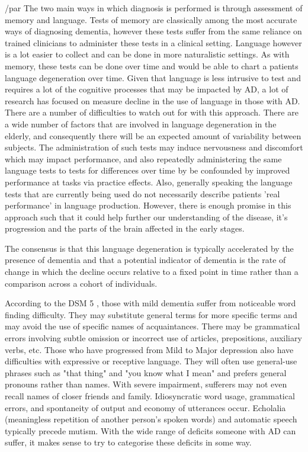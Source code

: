 \documentclass{article}
\begin{document}
/par
The two main ways in which diagnosis is performed is through assessment of memory and language. Tests of memory are classically among the most accurate ways of diagnosing dementia, however these tests suffer from the same reliance on trained clinicians to administer these tests in a clinical setting. Language however is a lot easier to collect and can be done in more naturalistic settings. As with memory, these tests can be done over time and would be able to chart a patients language degeneration over time. Given that language is less intrusive to test and requires a lot of the cognitive processes that may be impacted by AD, a lot of research has focused on measure decline in the use of language in those with AD. There are a number of difficulties to watch out for with this approach. There are a wide number of factors that are involved in language degeneration in the elderly, and consequently there will be an expected amount of variability between subjects. The administration of such tests may induce nervousness and discomfort which may impact performance, and also repeatedly administering the same language tests to tests for differences over time by be confounded by improved performance at tasks via practice effects. Also, generally speaking the language tests that are currently being used do not necessarily describe patients 'real performance' in language production. However, there is enough promise in this approach such that it could help further our understanding of the disease, it's progression and the parts of the brain affected in the early stages. \newline
\par  
The consensus is that this language degeneration is typically accelerated by the presence of dementia \cite{Berisha2015} and that a potential indicator of dementia is the rate of change in which the decline occurs relative to a fixed point in time rather than a comparison across a cohort of individuals. \newline
\par
According to the DSM 5 \cite{AmericanPsychiatricAssociation2013}, those with mild dementia suffer from noticeable word finding difficulty. They may substitute general terms for more specific terms and may avoid the use of specific names of acquaintances. There may be grammatical errors involving subtle omission or incorrect use of articles, prepositions, auxiliary verbs, etc. Those who have progressed from Mild to Major depression also have difficulties with expressive or receptive language. They will often use general-use phrases such as "that thing" and "you know what I mean" and prefers general pronouns rather than names. With severe impairment, sufferers may not even recall names of closer friends and family. Idiosyncratic word usage, grammatical errors, and spontaneity of output and economy of utterances occur. Echolalia (meaningless repetition of another person's spoken words) and automatic speech typically precede mutism. With the wide range of deficits someone with AD can suffer, it makes sense to try to categorise these deficits in some way.\newline
\end{document}
